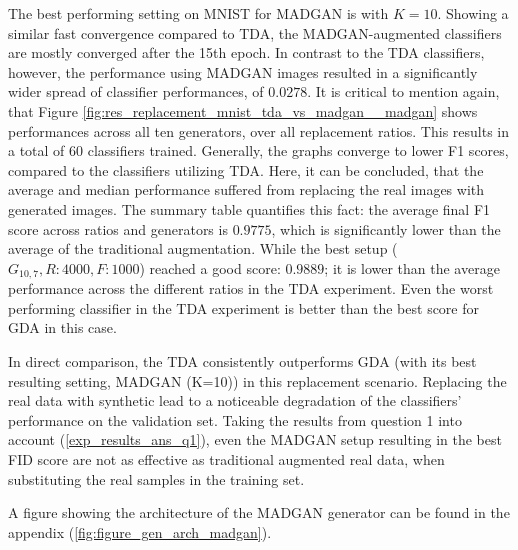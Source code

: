 The best performing setting on MNIST for MADGAN is with $K=10$. Showing a similar fast convergence compared to TDA, the MADGAN-augmented classifiers are mostly converged after the 15th epoch. In contrast to the TDA classifiers, however, the performance using MADGAN images resulted in a significantly wider spread of classifier performances, of $0.0278$. It is critical to mention again, that Figure \ref{fig:res_replacement_mnist_tda_vs_madgan__madgan} shows performances across all ten generators, over all replacement ratios. This results in a total of $60$ classifiers trained. Generally, the graphs converge to lower F1 scores, compared to the classifiers utilizing TDA. Here, it can be concluded, that the average and median performance suffered from replacing the real images with generated images. The summary table quantifies this fact: the average final F1 score across ratios and generators is $0.9775$, which is significantly lower than the average of the traditional augmentation. While the best setup (\(G_{10,7}, R:4000, F:1000\)) reached a good score: $0.9889$; it is lower than the average performance across the different ratios in the TDA experiment. Even the worst performing classifier in the TDA experiment is better than the best score for GDA in this case.

In direct comparison, the TDA consistently outperforms GDA (with its best resulting setting, MADGAN (K=10)) in this replacement scenario. Replacing the real data with synthetic lead to a noticeable degradation of the classifiers' performance on the validation set. Taking the results from question 1 into account (\ref{exp_results_ans_q1}), even the MADGAN setup resulting in the best FID score are not as effective as traditional augmented real data, when substituting the real samples in the training set.

A figure showing the architecture of the MADGAN generator can be found in the appendix (\ref{fig:figure_gen_arch_madgan}).

